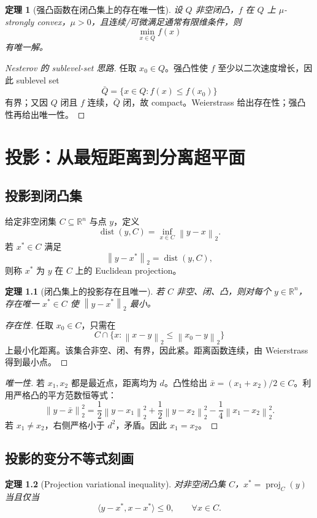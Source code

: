 \documentclass[11pt,a4paper,openany]{ctexrep}
\newtheorem{theorem}{定理}[chapter]
\theoremstyle{definition}
\newcommand{\R}{\mathbb{R}}
\newcommand{\dist}{\operatorname{dist}}
\newcommand{\proj}{\operatorname{proj}}
\newcommand{\inner}[2]{\langle #1,#2\rangle}
\newcommand{\norm}[1]{\left\lVert #1\right\rVert}
\begin{document}
\begin{theorem}[强凸函数在闭凸集上的存在唯一性]
设 $Q$ 非空闭凸，$f$ 在 $Q$ 上 $\mu$-strongly convex，$\mu>0$，且连续/可微满足通常有限维条件，则
\[
\min_{x\in Q}f(x)
\]
有唯一解。
\end{theorem}
\begin{proof}[Nesterov 的 sublevel-set 思路]
任取 $x_0\in Q$。强凸性使 $f$ 至少以二次速度增长，因此 sublevel set
\[
\bar Q=\{x\in Q:f(x)\le f(x_0)\}
\]
有界；又因 $Q$ 闭且 $f$ 连续，$\bar Q$ 闭，故 compact。Weierstrass 给出存在性；强凸性再给出唯一性。\cite[\S2.2.3, Thm.~2.2.10]{nesterov}
\end{proof}

\chapter{投影：从最短距离到分离超平面}

\section{投影到闭凸集}
给定非空闭集 $C\subseteq\R^n$ 与点 $y$，定义
\[
\dist(y,C)=\inf_{x\in C}\norm{y-x}_2.
\]
若 $x^*\in C$ 满足
\[
\norm{y-x^*}_2=\dist(y,C),
\]
则称 $x^*$ 为 $y$ 在 $C$ 上的 Euclidean projection。

\begin{theorem}[闭凸集上的投影存在且唯一]
若 $C$ 非空、闭、凸，则对每个 $y\in\R^n$，存在唯一 $x^*\in C$ 使 $\norm{y-x^*}_2$ 最小。
\end{theorem}

\begin{proof}[存在性]
任取 $x_0\in C$，只需在
\[
C\cap\{x:\norm{x-y}_2\le\norm{x_0-y}_2\}
\]
上最小化距离。该集合非空、闭、有界，因此紧。距离函数连续，由 Weierstrass 得到最小点。
\end{proof}

\begin{proof}[唯一性]
若 $x_1,x_2$ 都是最近点，距离均为 $d$。凸性给出 $\bar x=(x_1+x_2)/2\in C$。利用严格凸的平方范数恒等式：
\[
\norm{y-\bar x}_2^2
=\frac12\norm{y-x_1}_2^2+\frac12\norm{y-x_2}_2^2
-\frac14\norm{x_1-x_2}_2^2.
\]
若 $x_1\ne x_2$，右侧严格小于 $d^2$，矛盾。因此 $x_1=x_2$。
\end{proof}

\section{投影的变分不等式刻画}

\begin{theorem}[Projection variational inequality]
对非空闭凸集 $C$，$x^*=\proj_C(y)$ 当且仅当
\begin{equation}
\inner{y-x^*}{x-x^*}\le0,
\qquad \forall x\in C.
\label{eq:proj-vi}
\end{equation}
\end{theorem}
\end{document}
